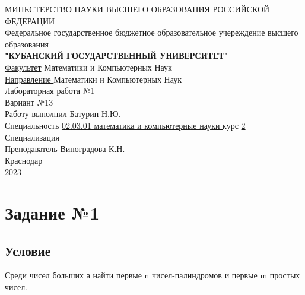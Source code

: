 \documentclass[a4paper]{article}
\begin{document}
\begin{center}
\hfill \break
{\large МИНЕСТЕРСТВО НАУКИ ВЫСШЕГО ОБРАЗОВАНИЯ РОССИЙСКОЙ ФЕДЕРАЦИИ}\\
{\large Федеральное государственное бюджетное образовательное учереждение высшего образования}\\
\hfill \break
{\large \textbf{"КУБАНСКИЙ ГОСУДАРСТВЕННЫЙ УНИВЕРСИТЕТ"}} \\
\hfill \break
{\large \underline {Факультет}}\: Математики и Компьютерных Наук\\
{\large \underline {Направление }}\: Математики и Компьютерных Наук\\

\hfill \break
\hfill \break
\hfill \break
{\Large Лабораторная работа №1}\\
{\Large Вариант  №13}\\
\hfill \break \hfill \break
\hfill \break \hfill \break
Работу выполнил \underline{\hspace{7cm}} Батурин Н.Ю.\\
\hfill \break
Специальность \underline{02.03.01 математика и компьютерные науки } курс \underline{ 2}\\
\hfill \break
Специализация \underline{\hspace{11cm}}\\
\hfill \break
Преподаватель \underline{\hspace{6cm}} Виноградова К.Н.\\
\hfill \break
\hfill \break 
\hfill \break \hfill \break
Краснодар\\
2023
\end{center}
\thispagestyle{empty}
\newpage
\begin{center}
\tableofcontents
\end{center}
\newpage
\section{Задание №1} 
\subsection{Условие}
Среди чисел больших а найти первые n чисел-палиндромов и первые m простых чисел.
\end{document}
